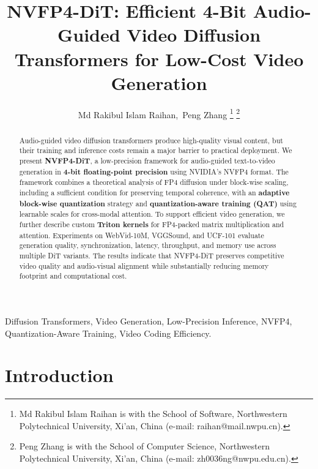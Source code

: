 \documentclass[journal,twoside]{IEEEtran}
\theoremstyle{definition}
\theoremstyle{remark}
\begin{document}
\title{NVFP4-DiT: Efficient 4-Bit Audio-Guided Video Diffusion Transformers for Low-Cost Video Generation}

\author{Md Rakibul Islam Raihan,~Peng Zhang%
\thanks{Md Rakibul Islam Raihan is with the School of Software, Northwestern Polytechnical University, Xi'an, China (e-mail: raihan@mail.nwpu.cn).}%
\thanks{Peng Zhang is with the School of Computer Science, Northwestern Polytechnical University, Xi'an, China (e-mail: zh0036ng@nwpu.edu.cn).}%
}

\maketitle

\begin{abstract}
Audio-guided video diffusion transformers produce high-quality visual content, but their training and inference costs remain a major barrier to practical deployment. We present \textbf{NVFP4-DiT}, a low-precision framework for audio-guided text-to-video generation in \textbf{4-bit floating-point precision} using NVIDIA's NVFP4 format. The framework combines a theoretical analysis of FP4 diffusion under block-wise scaling, including a sufficient condition for preserving temporal coherence, with an \textbf{adaptive block-wise quantization} strategy and \textbf{quantization-aware training (QAT)} using learnable scales for cross-modal attention. To support efficient video generation, we further describe custom \textbf{Triton kernels} for FP4-packed matrix multiplication and attention. Experiments on WebVid-10M, VGGSound, and UCF-101 evaluate generation quality, synchronization, latency, throughput, and memory use across multiple DiT variants. The results indicate that NVFP4-DiT preserves competitive video quality and audio-visual alignment while substantially reducing memory footprint and computational cost.
\end{abstract}

\begin{IEEEkeywords}
Diffusion Transformers, Video Generation, Low-Precision Inference, NVFP4, Quantization-Aware Training, Video Coding Efficiency.
\end{IEEEkeywords}

\section{Introduction}
\end{document}
